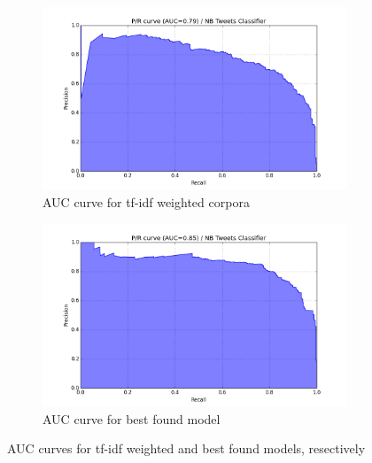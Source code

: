 \begin{figure}
  \centering
  \begin{subfigure}[b]{0.49\linewidth}
    \includegraphics[width=\linewidth]{Figures/pr_NB_Tweets_Classifier_03}
  \caption{AUC curve for tf-idf weighted corpora}
  \label{fig:auc-tfidf}
  \end{subfigure}
  \begin{subfigure}[b]{0.49\linewidth}
    \includegraphics[width=\linewidth]{Figures/pr_NB_Tweets_Classifier_04}
  \caption{AUC curve for best found model}
  \label{fig:auc-best-model}
  \end{subfigure}

  \caption{AUC curves for tf-idf weighted and best found models, resectively}
  \label{fig:auc-curves-tfidf-grid}
\end{figure}


